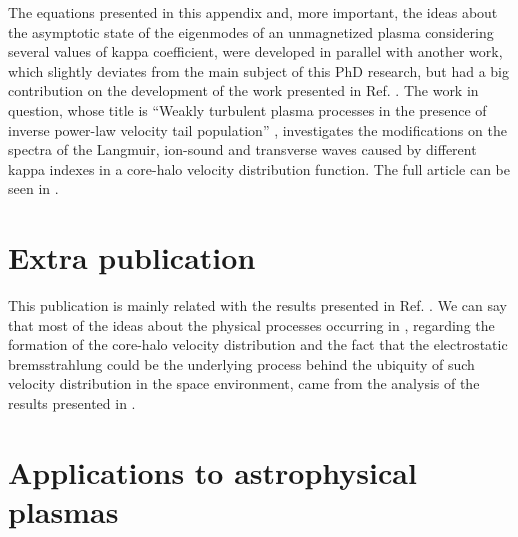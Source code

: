 \documentclass[12pt,a4paper,ruledheader]{report}
\begin{document}
\begin{appendix}
The equations presented in this appendix and, more important, the
ideas about the asymptotic state of the eigenmodes of an unmagnetized
plasma considering several values of kappa coefficient, were developed
in parallel with another work, which slightly deviates from the
main subject of this PhD research, but had a big contribution on the
development of the work presented in Ref. \cite{Tigik2017a}. 
The work in question, whose title
is ``Weakly turbulent plasma processes in the presence of inverse
power-law velocity tail population'' \cite{Tigik2017b}, investigates
the modifications on the spectra of the Langmuir, ion-sound and
transverse waves caused by different kappa indexes in a core-halo
velocity distribution function. The full article can be seen in
.


\chapter{Extra publication}
\label{appC}
This publication is mainly related with the results presented in
Ref. \cite{Tigik2017a}.
We can say that most of the ideas about the physical processes occurring
in \cite{Tigik2017a}, regarding the formation of the core-halo velocity
distribution and the fact that the electrostatic bremsstrahlung could be
the underlying process behind the ubiquity of such velocity distribution
in the space environment, came from the analysis of the results presented
in \cite{Tigik2017b}. 




\chapter{Applications to astrophysical plasmas}
\label{appD}



\end{appendix}
\end{document}

